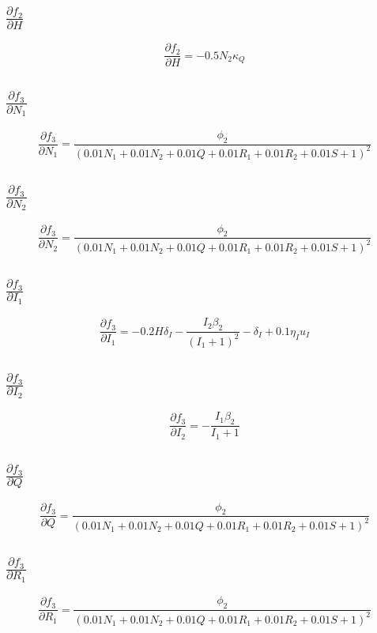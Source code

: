 \documentclass{article}
\begin{document}
\subsection{$\frac{\partial f_{2}}{\partial H}$}
\[
\frac{\partial f_{2}}{\partial H} = - 0.5 N_{2} \kappa_{Q}
\]

\subsection{$\frac{\partial f_{3}}{\partial N_1}$}
\[
\frac{\partial f_{3}}{\partial N_1} = \frac{\phi_{2}}{\left(0.01 N_{1} + 0.01 N_{2} + 0.01 Q + 0.01 R_{1} + 0.01 R_{2} + 0.01 S + 1\right)^{2}}
\]

\subsection{$\frac{\partial f_{3}}{\partial N_2}$}
\[
\frac{\partial f_{3}}{\partial N_2} = \frac{\phi_{2}}{\left(0.01 N_{1} + 0.01 N_{2} + 0.01 Q + 0.01 R_{1} + 0.01 R_{2} + 0.01 S + 1\right)^{2}}
\]

\subsection{$\frac{\partial f_{3}}{\partial I_1}$}
\[
\frac{\partial f_{3}}{\partial I_1} = - 0.2 H \delta_{I} - \frac{I_{2} \beta_{2}}{\left(I_{1} + 1\right)^{2}} - \delta_{I} + 0.1 \eta_{I} u_{I}
\]

\subsection{$\frac{\partial f_{3}}{\partial I_2}$}
\[
\frac{\partial f_{3}}{\partial I_2} = - \frac{I_{1} \beta_{2}}{I_{1} + 1}
\]

\subsection{$\frac{\partial f_{3}}{\partial Q}$}
\[
\frac{\partial f_{3}}{\partial Q} = \frac{\phi_{2}}{\left(0.01 N_{1} + 0.01 N_{2} + 0.01 Q + 0.01 R_{1} + 0.01 R_{2} + 0.01 S + 1\right)^{2}}
\]

\subsection{$\frac{\partial f_{3}}{\partial R_1}$}
\[
\frac{\partial f_{3}}{\partial R_1} = \frac{\phi_{2}}{\left(0.01 N_{1} + 0.01 N_{2} + 0.01 Q + 0.01 R_{1} + 0.01 R_{2} + 0.01 S + 1\right)^{2}}
\]
\end{document}
